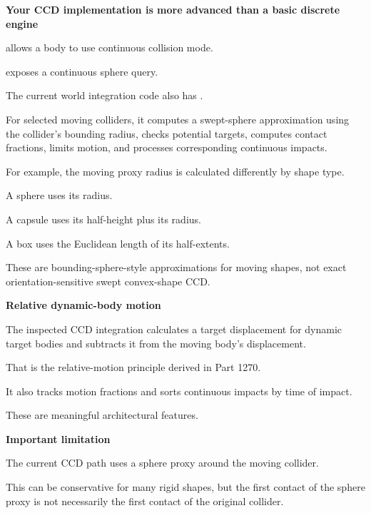 \textbf{Your CCD implementation is more advanced than a basic discrete engine}

 allows a body to use continuous collision mode.

 exposes a continuous sphere query.

The current world integration code also has .

For selected moving colliders, it computes a swept-sphere approximation using the collider's bounding radius, checks potential targets, computes contact fractions, limits motion, and processes corresponding continuous impacts.

For example, the moving proxy radius is calculated differently by shape type.

A sphere uses its radius.

A capsule uses its half-height plus its radius.

A box uses the Euclidean length of its half-extents.

These are bounding-sphere-style approximations for moving shapes, not exact orientation-sensitive swept convex-shape CCD.

\textbf{Relative dynamic-body motion}

The inspected CCD integration calculates a target displacement for dynamic target bodies and subtracts it from the moving body's displacement.

That is the relative-motion principle derived in Part 1270.

It also tracks motion fractions and sorts continuous impacts by time of impact.

These are meaningful architectural features.

\textbf{Important limitation}

The current CCD path uses a sphere proxy around the moving collider.

This can be conservative for many rigid shapes, but the first contact of the sphere proxy is not necessarily the first contact of the original collider.

